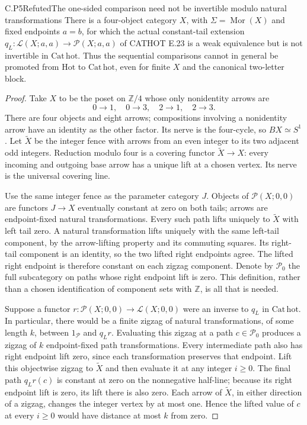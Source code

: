 \begin{result}{C.P5}{Refuted}{The one-sided comparison need not be invertible modulo natural transformations}
There is a four-object category $X$, with $\Sigma=\operatorname{Mor}(X)$ and fixed endpoints $a=b$, for which the actual constant-tail extension
$q_L:\mathcal L(X;a,a)\to\mathcal P(X;a,a)$ of CATHOT E.23 is a weak equivalence but is not invertible in $\mathrm{Cat}\,\mathrm{hot}$. Thus the sequential comparisons cannot in general be promoted from $\mathrm{Hot}$ to $\mathrm{Cat}\,\mathrm{hot}$, even for finite $X$ and the canonical two-letter block.
\end{result}
\begin{proof}
Take $X$ to be the poset on $\mathbb Z/4$ whose only nonidentity arrows are
\[
 0\to1,\quad0\to3,\quad2\to1,\quad2\to3.
\]
There are four objects and eight arrows; compositions involving a nonidentity arrow have an identity as the other factor. Its nerve is the four-cycle, so $BX\simeq S^1$. Let $\widetilde X$ be the integer fence with arrows from an even integer to its two adjacent odd integers. Reduction modulo four is a covering functor $\widetilde X\to X$: every incoming and outgoing base arrow has a unique lift at a chosen vertex. Its nerve is the universal covering line.

Use the same integer fence as the parameter category $J$. Objects of $\mathcal P(X;0,0)$ are functors $J\to X$ eventually constant at zero on both tails; arrows are endpoint-fixed natural transformations. Every such path lifts uniquely to $\widetilde X$ with left tail zero. A natural transformation lifts uniquely with the same left-tail component, by the arrow-lifting property and its commuting squares. Its right-tail component is an identity, so the two lifted right endpoints agree. The lifted right endpoint is therefore constant on each zigzag component. Denote by $\mathcal P_0$ the full subcategory on paths whose right endpoint lift is zero. This definition, rather than a chosen identification of component sets with $\mathbb Z$, is all that is needed.

Suppose a functor $r:\mathcal P(X;0,0)\to\mathcal L(X;0,0)$ were an inverse to $q_L$ in $\mathrm{Cat}\,\mathrm{hot}$. In particular, there would be a finite zigzag of natural transformations, of some length $k$, between $1_{\mathcal P}$ and $q_Lr$. Evaluating this zigzag at a path $c\in\mathcal P_0$ produces a zigzag of $k$ endpoint-fixed path transformations. Every intermediate path also has right endpoint lift zero, since each transformation preserves that endpoint. Lift this objectwise zigzag to $\widetilde X$ and then evaluate it at any integer $i\geq0$. The final path $q_Lr(c)$ is constant at zero on the nonnegative half-line; because its right endpoint lift is zero, its lift there is also zero. Each arrow of $\widetilde X$, in either direction of a zigzag, changes the integer vertex by at most one. Hence the lifted value of $c$ at every $i\geq0$ would have distance at most $k$ from zero.


\end{proof}
